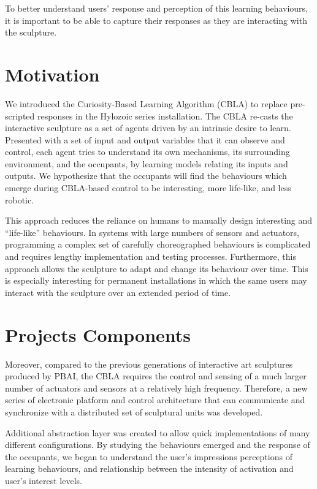 To better understand users' response and perception of this learning behaviours, it is important to be able to capture their responses as they are interacting with the sculpture. 

\section{Motivation}\label{sec:motivations}

We introduced the Curiosity-Based Learning Algorithm (CBLA) to replace pre-scripted responses in the Hylozoic series installation.  The CBLA re-casts the interactive sculpture as a set of agents driven by an intrinsic desire to learn.  Presented with a set of input and output variables that it can observe and control, each agent tries to understand its own mechanisms, its surrounding environment, and the occupants, by learning models relating its inputs and outputs. We hypothesize that the occupants will find the behaviours which emerge during CBLA-based control to be interesting, more life-like, and less robotic. 

This approach reduces the reliance on humans to manually design interesting and “life-like” behaviours. In systems with large numbers of sensors and actuators, programming a complex set of carefully choreographed behaviours is complicated and requires lengthy implementation and testing processes. Furthermore, this approach allows the sculpture to adapt and change its behaviour over time. This is especially interesting for permanent installations in which the same users may interact with the sculpture over an extended period of time. 


\section{Projects Components}

Moreover, compared to the previous generations of interactive art sculptures produced by PBAI, the CBLA requires the control and sensing of a much larger number of actuators and sensors at a relatively high frequency. Therefore, a new series of electronic platform and control architecture that can communicate and synchronize with a distributed set of sculptural units was developed.

Additional abstraction layer was created to allow quick implementations of many different configurations. By studying the behaviours emerged and the response of the occupants, we began to understand the user's impressions perceptions of learning behaviours, and relationship between the intensity of activation and user's interest levels. 


